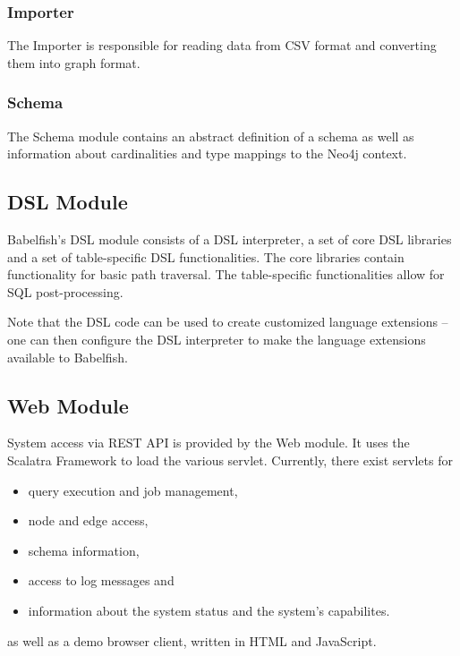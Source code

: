 \subsubsection{Importer}
The Importer is responsible for reading data from CSV format and converting them into graph format.
\subsubsection{Schema}
The Schema module contains an abstract definition of a schema as well as information about cardinalities and type mappings to the Neo4j context.

\subsection{DSL Module}
Babelfish's DSL module consists of a DSL interpreter, a set of core DSL libraries and a set of table-specific DSL functionalities.
The core libraries contain functionality for basic path traversal.
The table-specific functionalities allow for SQL post-processing.

Note that the DSL code can be used to create customized language extensions -- one can then configure the DSL interpreter to make the language extensions available to Babelfish.

\subsection{Web Module}
System access via REST API is provided by the Web module.
It uses the Scalatra Framework to load the various servlet.
Currently, there exist servlets for
\begin{itemize}
\item query execution and job management,
\item node and edge access,
\item schema information,
\item access to log messages and
\item information about the system status and the system's capabilites.
\end{itemize}

as well as a demo browser client, written in HTML and JavaScript.


